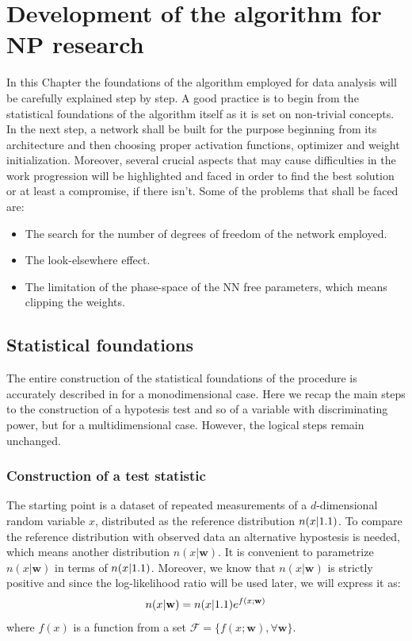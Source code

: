 \chapter{Development of the algorithm for NP research}
\label{chap:Z_5D}





In this Chapter the foundations of the algorithm employed for data analysis will be carefully explained step by step. A good practice is to begin from the statistical foundations of the algorithm itself as it is set on non-trivial concepts. In the next step, a network shall be built for the purpose beginning from its architecture and then choosing proper activation functions, optimizer and weight initialization. Moreover, several crucial aspects that may cause difficulties in the work progression will be highlighted and faced in order to find the best solution or at least a compromise, if there isn't. Some of the problems that shall be faced are:
\begin{itemize}
	\item The search for the number of degrees of freedom of the network employed.
	\item The look-elsewhere effect.
	\item The limitation of the phase-space of the NN free parameters, which means clipping the weights.
\end{itemize}





\section{Statistical foundations}
The entire construction of the statistical foundations of the procedure is accurately described in \cite{wulzer} for a monodimensional case. Here we recap the main steps to the construction of a hypotesis test and so of a variable with discriminating power, but for a multidimensional case. However, the logical steps remain unchanged.



\subsection{Construction of a test statistic}
The starting point is a dataset of repeated measurements of a $d$-dimensional random variable $x$, distributed as the reference distribution $n(x|1.1)$. To compare the reference distribution with observed data an alternative hypostesis is needed, which means another distribution $n(x|\mathbf{w})$. It is convenient to parametrize $n(x|\mathbf{w})$ in terms of $n(x|1.1)$. Moreover, we know that $n(x|\mathbf{w})$ is strictly positive and since the log-likelihood ratio will be used later, we will express it as:
\begin{equation}
	n(x|\mathbf{w}) = n(x|1.1) e^{f(x;\mathbf{w})}
\end{equation}
where $f(x)$ is a function from a set $\mathcal{F} = \{ f(x;\mathbf{w}), \forall \mathbf{w} \}$.

